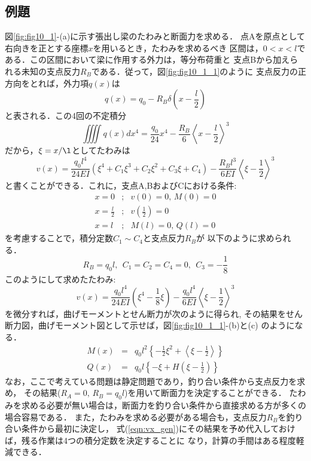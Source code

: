 \documentclass[10pt,a4j]{jarticle}
\begin{document}
\subsection{例題}
図\ref{fig:fig10_1}-(a)に示す張出し梁のたわみと断面力を求める．
点Aを原点として右向きを正とする座標$x$を用いるとき，たわみを求めるべき
区間は，$0<x<l$である．この区間において梁に作用する外力は，等分布荷重と
支点Bから加えられる未知の支点反力$R_B$である．従って，図\ref{fig:fig10_1_1}のように
支点反力の正方向をとれば，外力項$q(x)$は
\begin{equation}
	q(x)=q_0-R_B\delta\left(x-\frac{l}{2}\right)
	\label{eqn:qx}
\end{equation}
と表される．この4回の不定積分
\begin{equation}
	\iiiint q(x) dx^4= \frac{q_0}{24}x^4-\frac{R_B}{6}\left<x-\frac{l}{2}\right>^3
	\label{eqn:int_qx4}
\end{equation}
だから，$\xi=x/\l$としてたわみは
\begin{equation}
	v(x)=\frac{q_0l^4}{24EI}\left( \xi^4+C_1\xi^3 +C_2\xi^2+C_3\xi+C_4\right)
	-
	\frac{R_Bl^3}{6EI}\left< \xi-\frac{1}{2}\right>^3
	\label{eqn:vx_gen}
\end{equation}
と書くことができる．これに，支点A,BおよびCにおける条件:
\begin{eqnarray}
	x=0 &;& v(0)=0, \, M(0)=0 
	\\
	x=\frac{l}{2} &;& v\left( \frac{1}{2} \right)=0
	\\
	x=l &;& M(l)=0,\, Q(l)=0
\end{eqnarray}
を考慮することで，積分定数$C_1\sim C_4$と支点反力$R_B$が
以下のように求められる．
\begin{equation}
	R_B=q_0l, \ \ C_1=C_2=C_4=0, \ \ C_3=-\frac{1}{8}
\end{equation}
このようにして求めたたわみ:
\begin{equation}
	v(x)=\frac{q_0l^4}{24EI}\left( \xi^4-\frac{1}{8}\xi\right)
	-
	\frac{q_0l^4}{6EI}\left< \xi-\frac{1}{2}\right>^3
	\label{eqn:vx}
\end{equation}
を微分すれば，曲げモーメントとせん断力が次のように得られ, 
その結果をせん断力図，曲げモーメント図として示せば，図\ref{fig:fig10_1_1}-(b)と(c)
のようになる．
\begin{eqnarray}
	M(x)&=&
	q_0l^2 \left\{ -\frac{1}{2}\xi^2 + \left< \xi -\frac{1}{2}\right> \right\}
	\\
	Q(x)&=&
	q_0l \left\{-\xi+H\left(\xi-\frac{1}{2}\right)\right\}
\end{eqnarray}
なお，ここで考えている問題は静定問題であり，釣り合い条件から支点反力を求め，
その結果($R_A=0,\, R_B=q_0l$)を用いて断面力を決定することができる．
たわみを求める必要が無い場合は，断面力を釣り合い条件から直接求める方が多くの場合容易である．
また，たわみを求める必要がある場合も，支点反力$R_B$を釣り合い条件から最初に決定し，
式(\ref{eqn:vx_gen})にその結果を予め代入しておけば，残る作業は4つの積分定数を決定することに
なり，計算の手間はある程度軽減できる．
\end{document}
